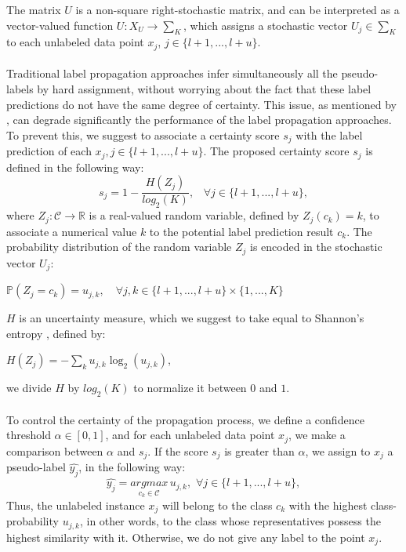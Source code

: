 \documentclass[conference]{IEEEtran}
\begin{document}
The matrix $U$ is a non-square right-stochastic matrix, and can be interpreted as a vector-valued function $U : X_U \rightarrow \sum_K$, which assigns a stochastic vector $U_j \in \sum_K$ to each unlabeled data point $x_j$, $j \in \{l+1, ..., l+u \}$. 
\\
\\ Traditional label propagation approaches infer simultaneously all the pseudo-labels by hard assignment, without worrying about the fact that these label predictions do not have the same degree of certainty. This issue, as mentioned by \cite{iscen2019label}, can degrade significantly the performance of the label propagation approaches. To prevent this, we suggest to associate a certainty score $s_j$ with the label prediction of each $x_j, j \in \{l+1, ..., l+u \}$. The proposed certainty score $s_j$ is defined in the following way:
\begin{equation}
s_j = 1 -  \frac{H(Z_j)}{log_2(K)}, \, \, \, \, \, \forall j \in \{l+1, ..., l+u \},
\end{equation}
where $Z_j : \mathcal{C} \rightarrow  \mathbb{R}$ is a real-valued random variable, defined by $Z_j(c_k) =k$, to associate a numerical value $k$ to the potential label prediction result $c_k$. The probability distribution of the random variable $Z_j$ is encoded in the stochastic vector $U_j$:
\begin{center}
    $\mathbb{P}(Z_j = c_k) =u_{j,k}, \,\, \, \, \, \, \forall j,k \in \{l+1, ..., l+u \} \times \{1, ..., K\}$
\end{center}
$H$ is an uncertainty measure, which we suggest to take equal to Shannon's entropy \cite{shannon2001mathematical}, defined by: 
\begin{center}
    $H(Z_j)  = - \sum_k u_{j,k}\log_2(u_{j,k})$,
\end{center}
we divide $H$ by $log_2(K)$ to normalize it between $0$ and $1$.
\\
\\ To control the certainty of the propagation process, we define a confidence threshold $\alpha \in [0, 1]$, and for each unlabeled data point $x_j$, we make a comparison between $\alpha$ and $s_j$. If the score $s_j$ is greater than $\alpha$, we assign to $x_j$ a pseudo-label $\hat{y_{j}}$, in the following way:
\begin{equation}
\hat{y_{j}} =  \underset{c_{k} \in \mathcal{C}}{argmax} \, u_{j,k}, \, \,  \forall j \in \{l+1, ..., l+u \},
\end{equation}
Thus, the unlabeled instance $x_j$ will belong to the class  $c_k$ with the highest class-probability $u_{j,k}$, in other words, to the class whose representatives possess the highest similarity with it. Otherwise, we do not give any label to the point $x_j$.
\end{document}
